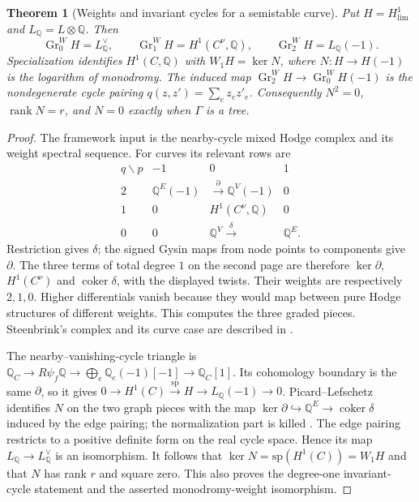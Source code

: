 \documentclass[11pt]{article}
\newtheorem{theorem}{Theorem}[section]
\theoremstyle{definition}
\theoremstyle{remark}
\newcommand{\Q}{\mathbb Q}
\begin{document}
\begin{theorem}[Weights and invariant cycles for a semistable curve]
\label{thm:derived-curve-monodromy}
Put $H=H^1_{\mathrm{lim}}$ and $L_\Q=L\otimes\Q$. Then
\[
 \operatorname{Gr}^W_0H=L_\Q^\vee,\qquad
 \operatorname{Gr}^W_1H=H^1(C^\nu,\Q),\qquad
 \operatorname{Gr}^W_2H=L_\Q(-1).
\]
Specialization identifies $H^1(C,\Q)$ with $W_1H=\ker N$, where
$N:H\to H(-1)$ is the logarithm of monodromy. The induced map
$\operatorname{Gr}^W_2H\to\operatorname{Gr}^W_0H(-1)$ is the
nondegenerate cycle pairing $q(z,z')=\sum_ez_ez'_e$.
Consequently $N^2=0$, $\operatorname{rank}N=r$, and $N=0$ exactly when
$\Gamma$ is a tree.
\end{theorem}

\begin{proof}
The framework input is the nearby-cycle mixed Hodge complex and its
weight spectral sequence. For curves its relevant rows are
\[
 \begin{array}{c|ccc}
 q\backslash p&-1&0&1\\ \hline
 2&\Q^E(-1)&\xrightarrow{\partial}\Q^V(-1)&0\\
 1&0&H^1(C^\nu,\Q)&0\\
 0&0&\Q^V\xrightarrow{\delta}&\Q^E .
 \end{array}
\]
Restriction gives $\delta$; the signed Gysin maps from node points to
components give $\partial$. The three terms of total degree $1$ on the
second page are therefore $\ker\partial$, $H^1(C^\nu)$ and
$\operatorname{coker}\delta$, with the displayed twists. Their weights
are respectively $2,1,0$. Higher differentials vanish because they would
map between pure Hodge structures of different weights. This computes
the three graded pieces. Steenbrink's complex and its curve case are
described in \cite[\S1, \S4]{ConsaniLocalMonodromy}.

The nearby--vanishing-cycle triangle is
$\Q_C\to R\psi_f\Q\to\bigoplus_e\Q_e(-1)[-1]\to\Q_C[1]$.
Its cohomology boundary is the same $\partial$, so it gives
$0\to H^1(C)\xrightarrow{\mathrm{sp}}H\to L_\Q(-1)\to0$.
Picard--Lefschetz identifies $N$ on the two graph pieces with the map
$\ker\partial\hookrightarrow\Q^E\to\operatorname{coker}\delta$
induced by the edge pairing; the normalization part is killed
\cite[\S6.1, (25)--(29)]{DCHMSupportHitchin}.
The edge pairing restricts to a positive definite form on the real cycle
space. Hence its map $L_\Q\to L_\Q^\vee$ is an isomorphism.
It follows that $\ker N=\mathrm{sp}(H^1(C))=W_1H$ and that $N$ has rank
$r$ and square zero. This also proves the degree-one invariant-cycle
statement and the asserted monodromy-weight isomorphism.
\end{proof}
\end{document}
